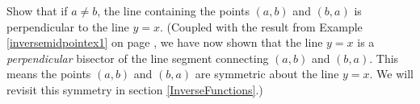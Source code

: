 {\label{inversemidpointex2} Show that if  $a \neq b$, the line containing the points $(a,b)$ and $(b,a)$ is perpendicular to the line $y = x$. (Coupled with the result from Example \ref{inversemidpointex1} on page \pageref{inversemidpoint}, we have now shown that the line $y = x$ is a \textit{perpendicular} bisector of the line segment connecting $(a,b)$ and $(b,a)$.  This means the points $(a,b)$ and $(b,a)$ are symmetric about the line $y = x$.  We will revisit this symmetry in section \ref{InverseFunctions}.) }
{}